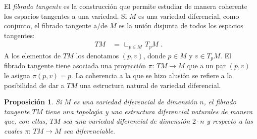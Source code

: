 \theoremstyle{plain}
\newtheorem{propoFibradoTangente}{Proposici\'{o}n}[section]
\newtheorem{propoElDiferencialFuntorial}[propoFibradoTangente]{Proposici\'{o}n}

\theoremstyle{remark}



El \emph{fibrado tangente} es la construcci\'{o}n que permite estudiar de
manera coherente los espacios tangentes a una variedad. Si $M$ es una
variedad diferencial, como conjunto, el fibrado tangente a/de $M$ es la
uni\'{o}n disjunta de todos los espacios tangentes:
\begin{align*}
	TM & \,=\,\sqcup_{p\in M}\,T_{p}M
	\text{ .}
\end{align*}
%
A los elementos de $TM$ los denotamos $(p,v)$, donde $p\in M$ y $v\in T_{p}M$.
El fibrado tangente tiene asociada una proyecci\'{o}n
$\pi:\,TM\rightarrow M$ que a un par $(p,v)$ le asigna $\pi(p,v)=p$. La
coherencia a la que se hizo alusi\'{o}n se refiere a la posibilidad de dar a
$TM$ una estructura natural de variedad diferencial.

\begin{propoFibradoTangente}\label{thm:fibradotangente}
	Si $M$ es una variedad diferencial de dimensi\'{o}n $n$, el fibrado
	tangente $TM$ tiene una topolog\'{\i}a y una estructura diferencial
	naturales de manera que, con ellas, $TM$ sea una variedad diferencial
	de dimensi\'{o}n $2\cdot n$ y respecto a las cuales
	$\pi:\,TM\rightarrow M$ sea diferenciable.
\end{propoFibradoTangente}

